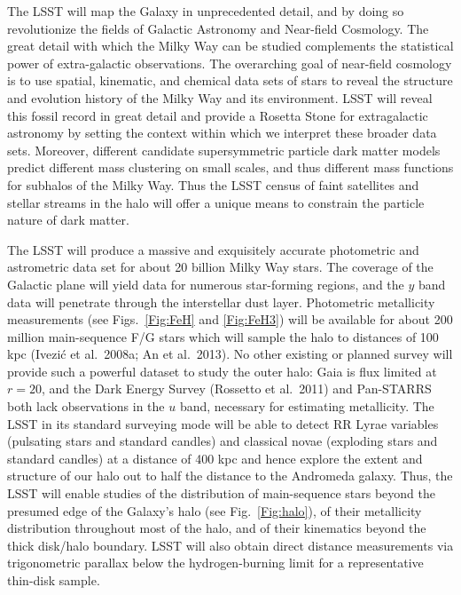 \documentclass{emulateapj}
\begin{document}
The LSST will map the Galaxy in unprecedented detail, and by doing so revolutionize the fields of Galactic 
Astronomy and Near-field Cosmology. The great detail with which the Milky Way can be studied complements 
the statistical power of extra-galactic observations.  The overarching goal of near-field cosmology is to use 
spatial, kinematic, and chemical data sets of stars to reveal the structure and evolution history of the Milky Way
and its environment. LSST will reveal this fossil record in great detail and provide a Rosetta Stone for extragalactic 
astronomy by setting the context within which we interpret these
broader data sets. Moreover, different candidate supersymmetric
particle dark matter models predict different mass clustering on small
scales, and thus different mass functions for subhalos of the Milky
Way.  Thus the LSST census of faint satellites and stellar streams in
the halo will offer a unique means to constrain the 
particle nature of dark matter.  

The LSST will produce a massive and exquisitely accurate photometric and astrometric data set for about 20 billion 
Milky Way stars. The coverage of the Galactic plane will yield data for numerous star-forming 
regions, and the $y$ band data will penetrate through the interstellar dust layer. Photometric metallicity 
measurements (see Figs.~\ref{Fig:FeH} and \ref{Fig:FeH3}) will be available for about 200 million main-sequence 
F/G stars which will sample the halo to distances of 100 kpc (Ivezi\'{c} et al.~2008a; An et al.~2013). No other 
existing or planned survey will provide such a powerful dataset to
study the outer halo: Gaia
is flux limited at $r=20$, and the Dark Energy Survey (Rossetto et al.~2011) and Pan-STARRS both 
lack observations in the $u$ band, necessary for estimating metallicity. The LSST in its standard surveying mode will 
be able to detect RR Lyrae variables (pulsating stars and standard candles) and classical novae (exploding stars 
and standard candles) at a distance of 400 kpc and hence explore the extent and structure of our  halo out to 
half the distance to the Andromeda galaxy. Thus, the LSST will enable studies of the distribution of main-sequence 
stars beyond the presumed edge of the Galaxy's halo (see Fig.~\ref{Fig:halo}), of their metallicity distribution
throughout most of the halo, and of their kinematics beyond the thick disk/halo boundary. LSST will also obtain 
direct distance measurements via trigonometric parallax below the hydrogen-burning limit for a representative
thin-disk sample.
\end{document}
